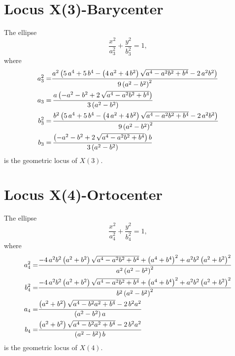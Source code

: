 \documentclass[11pt]{amsart}
\theoremstyle{plain}
\theoremstyle{definition}
\begin{document}
 
  \section{Locus X(3)-Barycenter}
 
 The ellipse \[ \frac{x^2}{a_{3}^2}+\frac{y^2}{b_{3}^2}=1, \]
 where
 \[\aligned 
 a_3^2=&      {\frac {{a}^{2} \left( 5\,{a}^{4}+5\,{b}^{4}- \left( 4\,{a}^{2}+4
 		\,{b}^{2} \right) \sqrt {{a}^{4}-{a}^{2}{b}^{2}+{b}^{4}}-2\,{a}^{2}{b}
 		^{2} \right) }{ 9\left( {a}^{2}-{b}^{2} \right) ^{2}}}\\
 	a_3=& \,{\frac {a \left( -{a}^{2}-{b}^{2}+2\,\sqrt {{a}^{4}-{a}^{2}{b}^{2
 				}+{b}^{4}} \right) }{3 \left( a^2-b^2 \right)    }}
 \\
 b_3^2=&   \,{\frac {{b}^{2} \left( 5\,{a}^{4}+5\,{b}^{4}- \left( 4\,{a}^{2}+4
 		\,{b}^{2} \right) \sqrt {{a}^{4}-{a}^{2}{b}^{2}+{b}^{4}}-2\,{a}^{2}{b}
 		^{2} \right) }{ 9\left( {a}^{2}-{b}^{2} \right) ^{2}}}\\
 	b_3=&  \,{\frac { \left( -{a}^{2}-{b}^{2}+2\,\sqrt {{a}^{4}-{a}^{2}{b}^{2}
 				+{b}^{4}} \right) b}{3 \left( a^2-b^2 \right)    }}
 \endaligned\] 
 is the geometric locus of $X(3)$.
 
  \section{Locus X(4)-Ortocenter}
 
 The ellipse \[ \frac{x^2}{a_{4}^2}+\frac{y^2}{b_{4}^2}=1, \]
 where
 \[\aligned 
 a_4^2=&    {\frac {-4\,{a}^{2}{b}^{2} \left( {a}^{2}+{b}^{2} \right) \sqrt {{a}^{
 				4}-{a}^{2}{b}^{2}+{b}^{4}}+ \left( {a}^{4}+{b}^{4} \right) ^{2}+{a}^{2
 		}{b}^{2} \left( {a}^{2}+{b}^{2} \right) ^{2}}{{a}^{2} \left( {a}^{2}-{
 			b}^{2} \right) ^{2}}}
 \\
 b_4^2=&  {\frac {-4\,{a}^{2}{b}^{2} \left( {a}^{2}+{b}^{2} \right) \sqrt {{a}^{
 				4}-{a}^{2}{b}^{2}+{b}^{4}}+ \left( {a}^{4}+{b}^{4} \right) ^{2}+{a}^{2
 		}{b}^{2} \left( {a}^{2}+{b}^{2} \right) ^{2}}{{b}^{2} \left( {a}^{2}-{
 			b}^{2} \right) ^{2}}}\\
 		a_4=&{\frac { \left( {a}^{2}+{b}^{2} \right) \sqrt {{a}^{4}-{b}^{2}{a}^{2}+
 					{b}^{4}}-2\,{b}^{2}{a}^{2}}{\left({a}^{2}-{b}^{2}\right)a}}\\
 b_4=&{\frac { \left( {a}^{2}+{b}^{2} \right) \sqrt {{a}^{4}-{b}^{2}{a}^{2}+
 {b}^{4}}-2\,{b}^{2}{a}^{2}}{\left({a}^{2}-{b}^{2}\right)b}}
 \endaligned 
 \] 
 is the geometric locus of $X(4)$.
 
\end{document}
